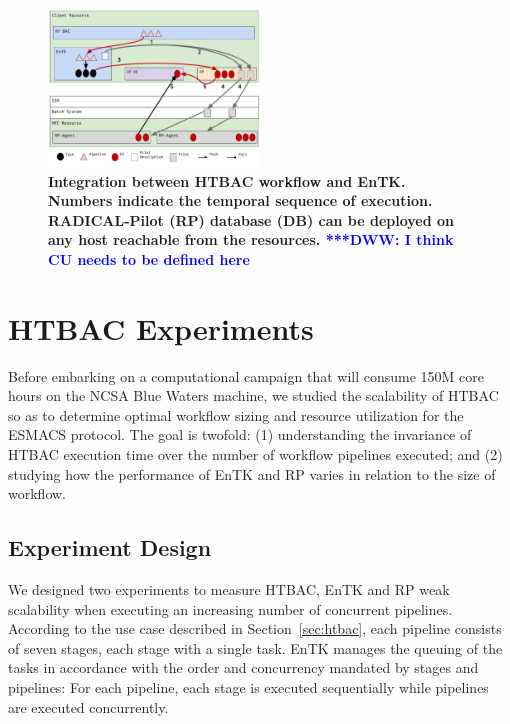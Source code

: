 \documentclass[conference]{IEEEtran}
\newcommand{\dwwnote}[1]{ {\textcolor{blue} { ***DWW: #1 }}}
\newcommand{\dwwnote}[1]{}
\begin{document}
\begin{figure}
\centering
  \includegraphics[width=0.5\textwidth]{ht-bac-rp_integration.pdf}
  \caption{\bf Integration between HTBAC workflow and EnTK\@. Numbers
  indicate the temporal sequence of execution. RADICAL-Pilot (RP) database
  (DB) can be deployed on any host reachable from the
  resources.\dwwnote{I think CU needs to be defined here}}\label{figure:ht-bac_rp}
\end{figure}



%
%
%
%
 

%
%
%
\section{HTBAC Experiments}\label{sec:6}
%
%

Before embarking on a computational campaign that will consume 150M core
hours on the NCSA Blue Waters machine, we studied the scalability of HTBAC so
as to determine optimal workflow sizing and resource utilization for the
ESMACS protocol. The goal is twofold: (1) understanding the invariance of
HTBAC execution time over the number of workflow pipelines executed; and (2)
studying how the performance of EnTK and RP varies in relation to the size of
workflow.

%
\subsection{Experiment Design}\label{ssec:exp_design}

We designed two experiments to measure HTBAC, EnTK and RP weak scalability
when executing an increasing number of concurrent pipelines. According to the
use case described in Section~\ref{sec:htbac}, each pipeline consists of
seven stages, each stage with a single task. EnTK manages the queuing of the
tasks in accordance with the order and concurrency mandated by stages and
pipelines: For each pipeline, each stage is executed sequentially while
pipelines are executed concurrently.
\end{document}
